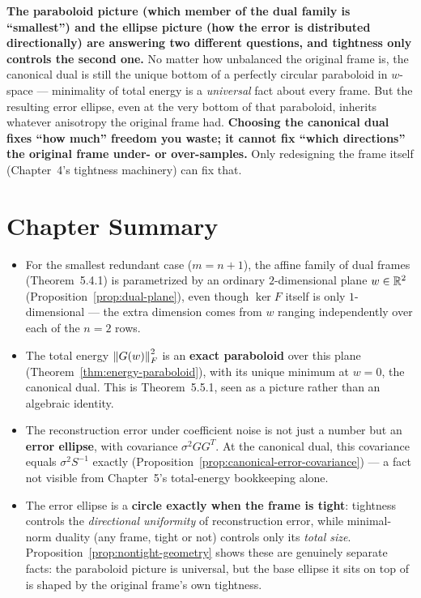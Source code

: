 \begin{keyidea}
\textbf{The paraboloid picture (which member of the dual family is
``smallest'') and the ellipse picture (how the error is distributed
directionally) are answering two different questions, and tightness
only controls the second one.} No matter how unbalanced the original
frame is, the canonical dual is still the unique bottom of a perfectly
circular paraboloid in $w$-space --- minimality of total energy is a
\emph{universal} fact about every frame. But the resulting error
ellipse, even at the very bottom of that paraboloid, inherits whatever
anisotropy the original frame had. \textbf{Choosing the canonical dual
fixes ``how much'' freedom you waste; it cannot fix ``which directions''
the original frame under- or over-samples.} Only redesigning the frame
itself (Chapter~4's tightness machinery) can fix that.
\end{keyidea}

\section{Chapter Summary}
\label{sec:summary-ch6}

\begin{itemize}
  \item For the smallest redundant case ($m=n+1$), the affine family of
        dual frames (Theorem~5.4.1) is parametrized by an ordinary
        $2$-dimensional plane $w\in\mathbb{R}^2$
        (Proposition~\ref{prop:dual-plane}), even though $\ker F$ itself
        is only $1$-dimensional --- the extra dimension comes from $w$
        ranging independently over each of the $n=2$ rows.
  \item The total energy $\left\| G(w) \right\|_F^2$ is an \textbf{exact
        paraboloid} over this plane
        (Theorem~\ref{thm:energy-paraboloid}), with its unique minimum
        at $w=0$, the canonical dual. This is Theorem~5.5.1, seen as a
        picture rather than an algebraic identity.
  \item The reconstruction error under coefficient noise is not just a
        number but an \textbf{error ellipse}, with covariance
        $\sigma^2GG^T$. At the canonical dual, this covariance equals
        $\sigma^2S^{-1}$ exactly
        (Proposition~\ref{prop:canonical-error-covariance}) --- a fact
        not visible from Chapter~5's total-energy bookkeeping alone.
  \item The error ellipse is a \textbf{circle exactly when the frame is
        tight}: tightness controls the \emph{directional uniformity} of
        reconstruction error, while minimal-norm duality (any frame,
        tight or not) controls only its \emph{total size}.
        Proposition~\ref{prop:nontight-geometry} shows these are
        genuinely separate facts: the paraboloid picture is universal,
        but the base ellipse it sits on top of is shaped by the
        original frame's own tightness.
\end{itemize}

